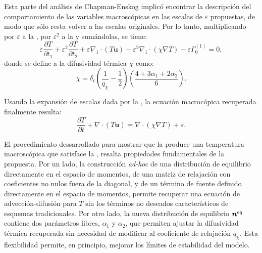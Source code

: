 Esta parte del an\'alisis de Chapman-Enskog implic\'o encontrar la descripci\'on del comportamiento de las variables macrosc\'opicas en las escalas de $\varepsilon$ propuestas, de modo que s\'olo resta volver a las escalas originales. Por lo tanto, multiplicando por $\varepsilon$ a la , por $\varepsilon^2$ a la  y sum\'andolas, se tiene:
\begin{equation}
	\varepsilon \dfrac{\partial T}{\partial t_1} + \varepsilon^2 \dfrac{\partial T}{\partial t_2} + \varepsilon \nabla_1 \cdot (T\bm{u}) - \varepsilon^2 \nabla_1 \cdot (\chi \nabla T) - \varepsilon \Gamma_0^{(1)} = 0,
\end{equation}
donde se define a la difusividad t\'ermica $\chi$ como:
\begin{equation}
	\chi = \delta_t \left( \dfrac{1}{q_{\chi}} - \dfrac{1}{2} \right) \left( \dfrac{4+3\alpha_1 + 2\alpha_2}{6} \right).
	\label{eq:modelo_2d_chi}
\end{equation}

Usando la expansi\'on de escalas dada por la , la ecuaci\'on macroc\'opica recuperada finalmente resulta:
\begin{equation}
	\dfrac{\partial T}{\partial t} + \nabla \cdot (T\bm{u}) = \nabla \cdot (\chi \nabla T) + s.
	\label{eq:T_2d}
\end{equation}

El procedimiento dessarrollado para mostrar que la  produce una temperatura macrosc\'opica que satisface la , resalta propiedades fundamentales de la propuesta. Por un lado, la construcci\'on \emph{ad-hoc} de una distribuci\'on de equilibrio directamente en el espacio de momentos, de una matriz de relajaci\'on con coeficientes no nulos fuera de la diagonal, y de un t\'ermino de fuente definido directamente en el espacio de momentos, permite recuperar una ecuaci\'on de advecci\'on-difusi\'on para $T$ sin los t\'erminos no deseados caracter\'isticos de esquemas tradicionales. Por otro lado, la nueva distribuci\'on de equilibrio $\bm{n}^{eq}$ contiene dos par\'ametros libres, $\alpha_1$ y $\alpha_2$, que permiten ajustar la difusividad t\'ermica recuperada sin necesidad de modificar al coeficiente de relajaci\'on $q_{\chi}$. Esta flexibilidad permite, en principio, mejorar los l\'imites de estabilidad del modelo.

